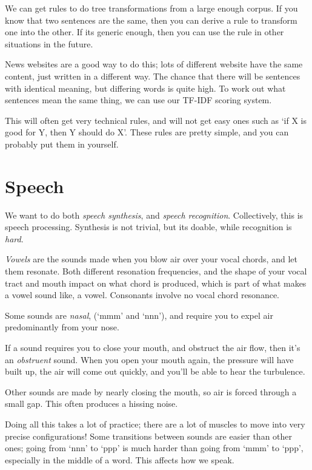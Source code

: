 We can get rules to do tree transformations from a large enough corpus. If you
know that two sentences are the same, then you can derive a rule to transform
one into the other. If its generic enough, then you can use the rule in other
situations in the future.

News websites are a good way to do this; lots of different website have the same
content, just written in a different way. The chance that there will be
sentences with identical meaning, but differing words is quite high. To work out
what sentences mean the same thing, we can use our TF-IDF scoring system.

This will often get very technical rules, and will not get easy ones such as `if
X is good for Y, then Y should do X'. These rules are pretty simple, and you can
probably put them in yourself.

\section{Speech}

We want to do both \textit{speech synthesis}, and \textit{speech recognition}.
Collectively, this is speech processing. Synthesis is not trivial, but its
doable, while recognition is \textit{hard}.

\textit{Vowels} are the sounds made when you blow air over your vocal chords,
and let them resonate. Both different resonation frequencies, and the shape of
your vocal tract and mouth impact on what chord is produced, which is part of
what makes a vowel sound like, a vowel. Consonants involve no vocal chord
resonance.

Some sounds are \textit{nasal}, (`mmm' and `nnn'), and require you to expel air
predominantly from your nose.

If a sound requires you to close your mouth, and obstruct the air flow, then
it's an \textit{obstruent} sound. When you open your mouth again, the pressure
will have built up, the air will come out quickly, and you'll be able to hear
the turbulence.

Other sounds are made by nearly closing the mouth, so air is forced through a
small gap. This often produces a hissing noise.

Doing all this takes a lot of practice; there are a lot of muscles to move into
very precise configurations! Some transitions between sounds are easier than
other ones; going from `nnn' to `ppp' is much harder than going from `mmm' to
`ppp', especially in the middle of a word. This affects how we speak.

